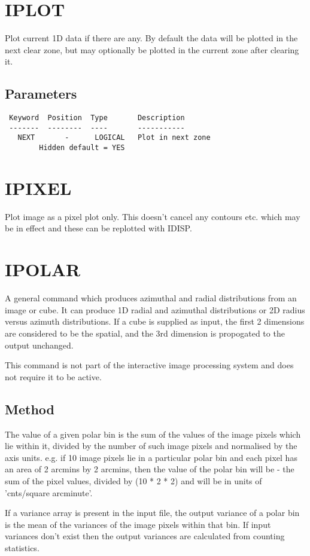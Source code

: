 \documentclass{book}
\renewcommand{\_}{{\tt\char'137}}     %
\begin{document}
\section{IPLOT}
Plot current 1D data if there are any. By default the data will be
plotted in the next clear zone, but may optionally be plotted in the
current zone after clearing it.

\subsection{Parameters}
\begin{verbatim}
 Keyword  Position  Type       Description
 -------  --------  ----       -----------
   NEXT       -      LOGICAL   Plot in next zone
        Hidden default = YES

\end{verbatim}\section{IPIXEL}
Plot image as a pixel plot only. This doesn't cancel any contours
etc. which may be in effect and these can be replotted with IDISP.

\section{IPOLAR}
A general command which produces azimuthal and radial distributions
from an image or cube. It can produce 1D radial and azimuthal
distributions or 2D radius versus azimuth distributions. If a cube
is supplied as input, the first 2 dimensions are considered to be
the spatial, and the 3rd dimension is propogated to the output
unchanged.

This command is not part of the interactive image processing system
and does not require it to be active.

\subsection{Method}
The value of a given polar bin is the sum of the values of the image
pixels which lie within it, divided by the number of such image pixels
and normalised by the axis units. e.g. if 10 image pixels lie in a
particular polar bin and each pixel has an area of 2 arcmins by 2 arcmins,
then the value of the polar bin will be - the sum of the pixel values,
divided by (10 * 2 * 2) and will be in units of 'cnts/square
arcminute'.

If a variance array is present in the input file, the output
variance of a polar bin is the mean of the variances of the image pixels
within that bin. If input variances don't exist then the output
variances are calculated from counting statistics.
\end{document}

